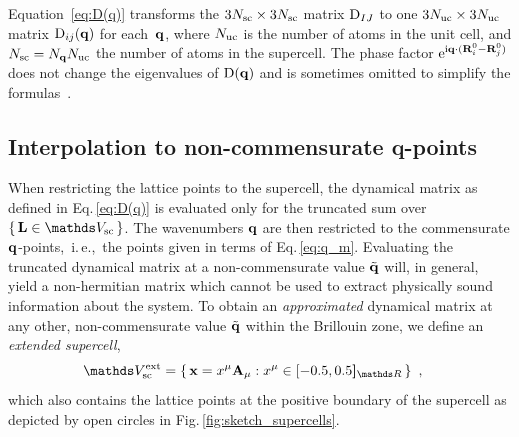 Equation~\eqref{eq:D(q)} transforms the $3N_{\rm sc} \times 3N_{\rm sc}$ matrix ${\rm D}_{IJ}$ to one $3N_{\rm uc} \times 3N_{\rm uc}$ matrix ${\rm D}_{ij} (\bf q)$ for each~${\bf q}$, where $N_{\rm uc}$ is the number of atoms in the unit cell, and $N_{\rm sc} = N_{\bf q} N_{\rm uc}$ the number of atoms in the supercell. 
The phase factor ${\rm e}^{{\rm i} {\bf q} \cdot ({\bf R}_i^0 - {\bf R}_j^0)}$ does not change the eigenvalues of ${\rm D} ({\bf q})$ and is sometimes omitted to simplify the formulas~\cite{BornHuang}.

\subsection{Interpolation to non-commensurate q-points}
When restricting the lattice points to the supercell, the dynamical matrix as defined in Eq.\,\eqref{eq:D(q)} is evaluated only for the truncated sum over $\set{\b L \in \mathds V_{\rm sc}}$. The wavenumbers ${\bf q}$ are then restricted to the commensurate ${\bf q}$-points,~i.\,e.,~the points given in terms of Eq.\,\eqref{eq:q_m}. Evaluating the truncated dynamical matrix at a non-commensurate value $\tilde{{\bf q}}$ will, in general, yield a non-hermitian matrix which cannot be used to extract physically sound information about the system. To obtain an \emph{approximated} dynamical matrix at any other, non-commensurate value $\tilde{{\bf q}}$ within the Brillouin zone, we define an \emph{extended supercell}, 
\begin{align}
	\mathds V_{\rm sc}^{\rm ext}
		&= \set{{\bf x} = x^\mu {\bf A}_\mu : x^\mu \in {[-0.5, 0.5 \boldsymbol{]}_{\mathds R}}}~,
	\label{eq:supercell.extended}
\end{align}
which also contains the lattice points at the positive boundary of the supercell as depicted by open circles in Fig.\,\ref{fig:sketch_supercells}.
